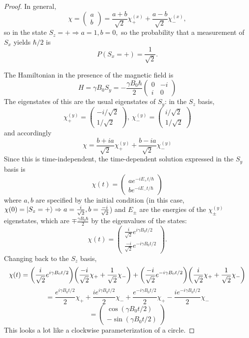 \documentclass{article}
\begin{document}
\begin{proof}
  In general,
  \[
    \chi =
    \begin{pmatrix}
      a \\
      b
    \end{pmatrix}
    = \frac{a + b}{\sqrt{2}}\chi_{+}^{(x)} + \frac{a - b}{\sqrt{2}}\chi_{-}^{(x)},
  \]
  so in the state $S_{z} = + \Rightarrow a = 1, b = 0,$ so the probability that a measurement of $S_{x}$ yields $\hbar / 2$ is
  \[
    P(S_{x} = +) = \frac{1}{\sqrt{2}}.
  \]

  The Hamiltonian in the presence of the magnetic field is
  \[
    H = \gamma B_{0}S_{y} = -\frac{\gamma B_{0}\hbar}{2}
    \begin{pmatrix}
      0 & -i \\
      i & 0
    \end{pmatrix}
  \]
  The eigenstates of this are the usual eigenstates of $S_{y}$: in the $S_{z}$ basis,
  \[
    \chi_{+}^{(y)} =
    \begin{pmatrix}
      -i / \sqrt{2} \\
      1 / \sqrt{2}
    \end{pmatrix},\
    \chi_{-}^{(y)} =
    \begin{pmatrix}
      i / \sqrt{2} \\
      1 / \sqrt{2}
    \end{pmatrix}
  \]
  and accordingly
  \[
    \chi = \frac{b + ia}{\sqrt{2}}\chi_{+}^{(y)} + \frac{b - ia}{\sqrt{2}}\chi_{-}^{(y)}
  \]
  Since this is time-independent, the time-dependent solution expressed in the $S_{y}$ basis is
  \[
    \chi(t) =
    \begin{pmatrix}
      ae^{-iE_{+}t/\hbar} \\
      be^{-iE_{-}t/\hbar}
    \end{pmatrix}
  \]
  where $a, b$ are specified by the initial condition (in this case, $\chi(0) = \ket{S_{z} = +} \Rightarrow a = \frac{i}{\sqrt{2}},
  b = \frac{-i}{\sqrt{2}}$)
  and $E_{\pm}$ are the energies of the $\chi_{\pm}^{(y)}$ eigenstates, which are $\mp \frac{\gamma B_{0}\hbar}{2}$ by the eigenvalues of the states:
  \[
    \chi(t) =
    \begin{pmatrix}
      \frac{i}{\sqrt{2}}e^{i\gamma B_{0}t/2} \\
      \frac{-i}{\sqrt{2}}e^{-i\gamma B_{0}t/2}
    \end{pmatrix}.
  \]
  Changing back to the $S_{z}$ basis,
  \[
    \chi(t) = \qty(\frac{i}{\sqrt{2}}e^{i\gamma B_{0}t/2})\qty(\frac{-i}{\sqrt{2}}\chi_{+} + \frac{1}{\sqrt{2}}\chi_{-})
    + \qty(\frac{-i}{\sqrt{2}}e^{-i\gamma B_{0}t/2})\qty(\frac{i}{\sqrt{2}}\chi_{+} + \frac{1}{\sqrt{2}}\chi_{-})
  \]
  \[
    = \frac{e^{i\gamma B_{0}t/2}}{2}\chi_{+} + \frac{ie^{i\gamma B_{0}t/2}}{2}\chi_{-} + \frac{e^{-i\gamma B_{0}t/2}}{2}\chi_{+}
    - \frac{ie^{-i\gamma B_{0}t/2}}{2}\chi_{-}
  \]
  \[
    =
    \begin{pmatrix}
      \cos(\gamma B_{0}t/2) \\
      -\sin(\gamma B_{0}t/2)
    \end{pmatrix}
  \]
  This looks a lot like a clockwise parameterization of a circle.


\end{proof}
\end{document}
